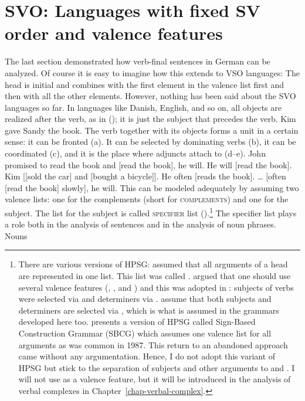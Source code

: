 \section{SVO: Languages with fixed SV order and valence features}
\label{sec-intro-schemata}
\label{sec-intro-spr-comps}

The last section demonstrated how verb-final sentences in German can be analyzed. Of course it is
easy to imagine how this extends to VSO languages: The head is initial and combines with the first
element in the valence list first and then with all the other elements. However, nothing has been
said about the SVO languages so far. In languages like Danish, English, and so on, all objects are
realized after the verb, as in (); it is just the subject that precedes the verb.
\ea
Kim gave Sandy the book.
\z
The verb together with its objects forms a unit in a certain sense: it can be fronted (a). It can be
selected by dominating verbs (b), it can be coordinated (c), and it is the place where adjuncts attach to (d--e).
\eal
\ex John promised to read the book and [read the book], he will.
\ex He will [read the book].
\ex Kim [[sold the car] and [bought a bicycle]]. 
\ex He often [reads the book].
\ex \ldots{} [often [read the book] slowly], he will.
\zl
This can be modeled adequately by assuming two valence lists: one for the complements (\comps short for \textsc{complements}) and
one for the subject. The list for the subject is called \textsc{specifier} list
(\spr).\footnote{%
  There are various versions of HPSG: \citet[Chapter~3.2]{ps} assumed that all arguments of a head are
  represented in one list. This list was called \subcatl. \citet{Borsley87a} argued that one should
  use several valence features (\subj, \spr, and \comps) and this was adopted in
  : subjects of verbs were selected via \subj and determiners via
  \spr. \citet*[Chapter~4.3]{SWB2003a} assume that both subjects and determiners are selected via \spr, which is
  what is assumed in the grammars developed here too. \citet[Section~3.3]{Sag2012a} presents a version of HPSG
  called Sign-Based Construction Grammar (SBCG) which assumes one valence list for all arguments as
  was common in 1987. This return to an abandoned approach came without any argumentation. Hence, I do not adopt this
  variant of HPSG but stick to the separation of subjects and other arguments to \spr and \comps. I
  will not use \subj as a valence feature, but it will be introduced in the analysis of verbal
  complexes in Chapter~\ref{chap-verbal-complex}.
} The specifier list plays a role both in the analysis of sentences and in the analysis of noun phrases. Nouns
